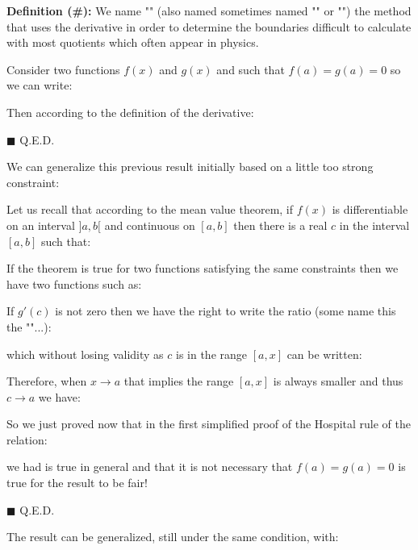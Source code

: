 \textbf{Definition (\#\mydef):} We name  "" (also named sometimes named "" or "\label{Hospital rule}") the method that uses the derivative in order to determine the boundaries difficult to calculate with most quotients which often appear in physics.

	\begin{dem}
		Consider two functions $f(x)$ and $g(x)$ and such that $f(a)=g(a)=0$ so we can write:
		
		Then according to the definition of the derivative:
		
		\begin{flushright}
			$\blacksquare$  Q.E.D.
		\end{flushright}		
	\end{dem}
We can generalize this previous result initially based on a little too strong constraint:
	
	\begin{dem}
Let us recall that according to the mean value theorem, if $f(x)$ is differentiable on an interval $]a, b[$ and continuous on $[a, b]$ then there is a real $c$ in the interval $[a, b]$ such that:
		
		If the theorem is true for two functions satisfying the same constraints then we have two functions such as:
		
		If $g'(c)$ is not zero then we have the right to write the ratio (some name this the ""...):	
		
		which without losing validity as $c$ is in the range $[a, x]$ can be written:
		
		Therefore, when $x \rightarrow a$ that implies the range $[a, x]$ is always smaller and thus $c \rightarrow a$ we have:
		
		So we just proved now that in the first simplified proof of the Hospital rule of the relation:
		
		we had is true in general and that it is not necessary that $f(a)=g(a)=0$ is true for the result to be fair!
		\begin{flushright}
			$\blacksquare$  Q.E.D.
		\end{flushright}
	\end{dem}
	\begin{tcolorbox}[title=Remark,colframe=black,arc=10pt]
	The result can be generalized, still under the same condition, with:
	
	\end{tcolorbox}
	
